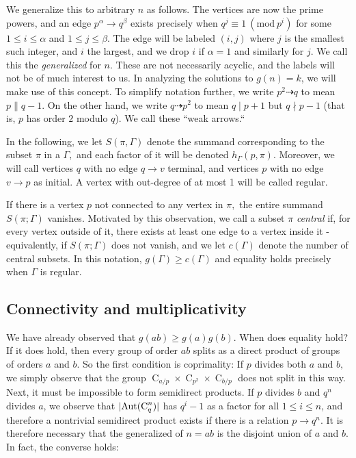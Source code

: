 \documentclass[draft]{article}
\DeclarePairedDelimiter\abs{\lvert}{\rvert}
\newcommand{\aut}[1]{\operatorname{Aut}(#1)}
\newcommand{\cyc}[1]{\operatorname{C}_{#1}}
\newcommand{\Mod}[1]{\ (\mathrm{mod} \ #1)}
\theoremstyle{plain}
\theoremstyle{definition}
\begin{document}
We generalize this to arbitrary $n$ as follows. The vertices are now the prime powers, and an edge $p^\alpha \rightarrow q^\beta$ exists precisely when $q^j \equiv 1 \Mod{p^i}$ for some $1 \le i \le \alpha$ and $1 \le j \le \beta$. The edge will be labeled $(i, j)$ where $j$ is the smallest such integer, and $i$ the largest, and we drop $i$ if $\alpha = 1$ and similarly for $j$. We call this the \emph{generalized \hg[1]} for $n.$ These are not necessarily acyclic, and the labels will not be of much interest to us. In analyzing the solutions to $g(n) = k$, we will make use of this concept. To simplify notation further, we write $p^2 \dashrightarrow q$ to mean $p \parallel q - 1$. On the other hand, we write $q \dashrightarrow p^2$ to mean $q \mid p + 1$ but $q \nmid p - 1$ (that is, $p$ has order $2$ modulo $q$). We call these ``weak arrows.``

In the following, we let $S(\pi, \Gamma)$ denote the summand corresponding to the subset $\pi$ in a \hg[1] $\Gamma,$ and each factor of it will be denoted $h_\Gamma(p, \pi).$ Moreover, we will call vertices $q$ with no edge $q \rightarrow v$ terminal, and vertices $p$ with no edge $v \rightarrow p$ as initial. A vertex with out-degree of at most 1 will be called regular.

If there is a vertex $p$ not connected to any vertex in $\pi,$ the entire summand $S(\pi; \Gamma)$ vanishes. Motivated by this observation, we call a subset $\pi$ \emph{central} if, for every vertex outside of it, there exists at least one edge to a vertex inside it - equivalently, if $S(\pi; \Gamma)$ does not vanish, and we let $c(\Gamma)$ denote the number of central subsets. In this notation, $g(\Gamma) \ge c(\Gamma)$ and equality holds precisely when $\Gamma$ is regular.

\subsection{Connectivity and multiplicativity}
We have already observed that $g(ab) \ge g(a)g(b).$ When does equality hold? If it does hold, then every group of order $ab$ splits as a direct product of groups of orders $a$ and $b.$ So the first condition is coprimality: If $p$ divides both $a$ and $b,$ we simply observe that the group $\cyc{a/p} \times \cyc{p^2} \times \cyc{b/p}$ does not split in this way. Next, it must be impossible to form semidirect products. If $p$ divides $b$ and $q^n$ divides $a$, we observe that $\abs{\aut{\cyc{q}^n}}$ has $q^i - 1$ as a factor for all $1 \le i \le n$, and therefore a nontrivial semidirect product exists if there is a relation $p \rightarrow q^n.$ It is therefore necessary that the generalized \hg[1] of $n = ab$ is the disjoint union of $a$ and $b$. In fact, the converse holds:
\end{document}
